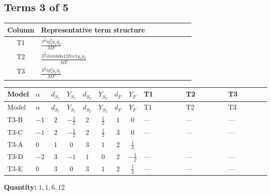 \documentclass[8pt]{article}
\begin{document}
\begin{landscape}
\subsection*{Terms 3 of 5}
\begin{center}
\begin{tabular}{@{}c >{\raggedright\arraybackslash}p{0.82\linewidth}@{}}
\toprule
Column & Representative term structure \\
\midrule
T1 & \(\displaystyle \frac{3^{\frac{3}{4}} i g_{2}^{2} \overline{y_{1}} \overline{y_{2}}}{MF}\) \\
\midrule
T2 & \(\displaystyle \frac{3^{\frac{3}{4}} i lambda12Inv1 \overline{y_{1}} \overline{y_{2}}}{MF}\) \\
\midrule
T3 & \(\displaystyle \frac{3^{\frac{3}{4}} i g_{1}^{2} \overline{y_{1}} \overline{y_{2}}}{MF}\) \\
\midrule
\bottomrule
\end{tabular}
\end{center}
\smallskip
\tiny
\begin{longtable}{@{}llcccccc >{\raggedright\arraybackslash}p{0.21\linewidth} >{\raggedright\arraybackslash}p{0.21\linewidth} >{\raggedright\arraybackslash}p{0.21\linewidth}@{}}
\toprule
Model & $\alpha$ & $d_{S_1}$ & $Y_{S_1}$ & $d_{S_2}$ & $Y_{S_2}$ & $d_F$ & $Y_F$ & T1 & T2 & T3 \\
\midrule
\endfirsthead
\toprule
Model & $\alpha$ & $d_{S_1}$ & $Y_{S_1}$ & $d_{S_2}$ & $Y_{S_2}$ & $d_F$ & $Y_F$ & T1 & T2 & T3 \\
\midrule
\endhead
T3-B & $-1$ & $2$ & $-\frac{1}{2}$ & $2$ & $\frac{1}{2}$ & $1$ & $0$ & --- & --- & --- \\
\midrule
T3-C & $-1$ & $2$ & $-\frac{1}{2}$ & $2$ & $\frac{1}{2}$ & $3$ & $0$ & --- & --- & --- \\
\midrule
T3-A & $0$ & $1$ & $0$ & $3$ & $1$ & $2$ & $\frac{1}{2}$ & \scriptsize\adjustbox{max width=\linewidth}{$\begin{gathered} - \frac{17 \cdot 3^{\frac{3}{4}} i g_{2}^{2} \overline{y_{1}} \overline{y_{2}}}{24 MF}\end{gathered}$} & \scriptsize\adjustbox{max width=\linewidth}{$\begin{gathered} - \frac{3^{\frac{3}{4}} i lambda12Inv1 \overline{y_{1}} \overline{y_{2}}}{6 MF}\end{gathered}$} & \scriptsize\adjustbox{max width=\linewidth}{$\begin{gathered} - \frac{3^{\frac{3}{4}} i g_{1}^{2} \overline{y_{1}} \overline{y_{2}}}{8 MF}\end{gathered}$} \\
\midrule
T3-D & $-2$ & $3$ & $-1$ & $1$ & $0$ & $2$ & $-\frac{1}{2}$ & --- & --- & --- \\
\midrule
T3-E & $0$ & $3$ & $0$ & $3$ & $1$ & $2$ & $\frac{1}{2}$ & --- & --- & --- \\
\midrule
\bottomrule
\end{longtable}
\clearpage
\noindent\textbf{Quantity: }$\mathrm{1,1,6,12}$\par\smallskip

\end{landscape}
\end{document}
